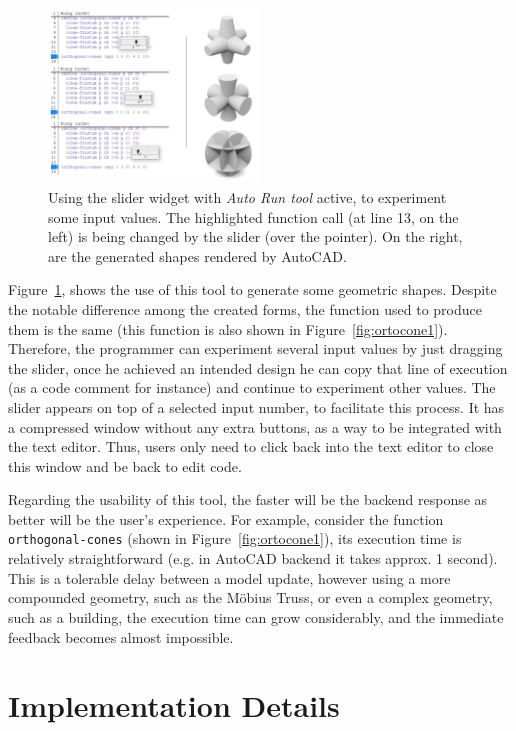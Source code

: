 \begin{figure}[!h]
  \centering
  \includegraphics[width=0.5\textwidth]{images/orto-cones-run}
    \caption{Using the slider widget with \textit{Auto Run tool} active, to experiment some input values. The highlighted function call (at line 13, on the left) is being changed by the slider (over the pointer). On the right, are the generated shapes rendered by AutoCAD.}
  \label{fig:orto-cone-run}
\end{figure}

Figure~\ref{fig:orto-cone-run}, shows the use of this tool to generate some geometric shapes. Despite the notable difference among the created forms, the function used to produce them is the same (this function is also shown in Figure~\ref{fig:ortocone1}). Therefore, the programmer can experiment several input values by just dragging the slider, once he achieved an intended design he can copy that line of execution (as a code comment for instance) and continue to experiment other values. The slider appears on top of a selected input number, to facilitate this process. It has a compressed window without any extra buttons, as a way to be integrated with the text editor. Thus, users only need to click back into the text editor to close this window and be back to edit code.

Regarding the usability of this tool, the faster will be the backend response as better will be the user's experience. For example, consider the function \texttt{orthogonal-cones} (shown in Figure~\ref{fig:ortocone1}), its execution time is relatively straightforward (e.g. in AutoCAD backend it takes approx. 1  second). This is a tolerable delay between a model update, however using a more compounded geometry, such as the Möbius Truss, or even a complex geometry, such as a building, the execution time can grow considerably, and the immediate feedback becomes almost impossible. 

\section{Implementation Details}

